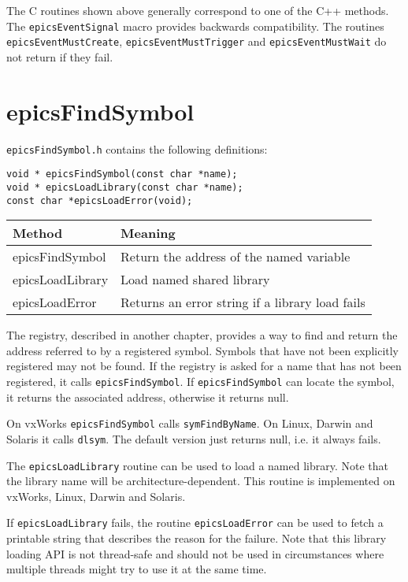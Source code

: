 The C routines shown above generally correspond to one of the C++ methods.
The \verb|epicsEventSignal| macro provides backwards compatibility.
The routines \verb|epicsEventMustCreate|, \verb|epicsEventMustTrigger| and \verb|epicsEventMustWait| do not return if they fail.

\section{epicsFindSymbol}

\verb|epicsFindSymbol.h| contains the following definitions:

\begin{verbatim}
void * epicsFindSymbol(const char *name);
void * epicsLoadLibrary(const char *name);
const char *epicsLoadError(void);
\end{verbatim}

\begin{center}
\begin{longtable}{p{1.38889in}p{2.5in}}
\textbf{Method} & \textbf{Meaning}\\
\hline
epicsFindSymbol & Return the address of the named variable\\
epicsLoadLibrary & Load named shared library\\
epicsLoadError & Returns an error string if a library load fails
\end{longtable}
\end{center}

The registry, described in another chapter, provides a way to find and return the address referred to by a registered symbol.
Symbols that have not been explicitly registered may not be found.
If the registry is asked for a name that has not been registered, it calls \verb|epicsFindSymbol|.
If \verb|epicsFindSymbol| can locate the symbol, it returns the associated address, otherwise it returns null.

On vxWorks \verb|epicsFindSymbol| calls \verb|symFindByName|.
On Linux, Darwin and Solaris it calls \verb|dlsym|.
The default version just returns null, i.e. it always fails.

The \verb|epicsLoadLibrary| routine can be used to load a named library.
Note that the library name will be architecture-dependent.
This routine is implemented on vxWorks, Linux, Darwin and Solaris.

If \verb|epicsLoadLibrary| fails, the routine \verb|epicsLoadError| can be used to fetch a printable string that describes the reason for the failure.
Note that this library loading API is not thread-safe and should not be used in circumstances where multiple threads might try to use it at the same time.

